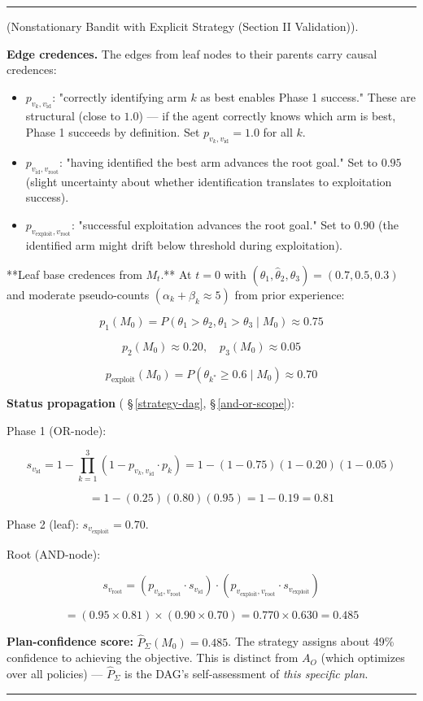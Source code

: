 \documentclass[11pt,oneside]{article}
\newcounter{claim}[section]
\renewcommand{\theclaim}{\thesection.\arabic{claim}}
\newenvironment{segment}[2]{%
  \refstepcounter{claim}%
  \bigskip\noindent\hrule\smallskip
  \noindent{\bfseries #1~\theclaim}\enskip(#2).\par\smallskip
  \noindent\ignorespaces
}{%
  \par\smallskip\noindent\hrule\bigskip
}
\newenvironment{remark}[1][]{\begin{segment}{Remark}{#1}}{\end{segment}}
\begin{document}
\begin{remark}[Nonstationary Bandit with Explicit Strategy (Section II Validation)]
\textbf{Edge credences.} The edges from leaf nodes to their parents carry causal credences:
\begin{itemize}
  \item $p_{v_k, v_\text{id}}$: "correctly identifying arm $k$ as best enables Phase 1 success." These are structural (close to $1.0$) — if the agent correctly knows which arm is best, Phase 1 succeeds by definition. Set $p_{v_k, v_\text{id}} = 1.0$ for all $k$.
  \item $p_{v_\text{id}, v_\text{root}}$: "having identified the best arm advances the root goal." Set to $0.95$ (slight uncertainty about whether identification translates to exploitation success).
  \item $p_{v_\text{exploit}, v_\text{root}}$: "successful exploitation advances the root goal." Set to $0.90$ (the identified arm might drift below threshold during exploitation).
\end{itemize}


**Leaf base credences from $M_t$.** At $t = 0$ with $(\hat\theta_1, \hat\theta_2, \hat\theta_3) = (0.7, 0.5, 0.3)$ and moderate pseudo-counts $(\alpha_k + \beta_k \approx 5)$ from prior experience:

$$p_1(M_0) = P(\theta_1 > \theta_2, \theta_1 > \theta_3 \mid M_0) \approx 0.75$$

$$p_2(M_0) \approx 0.20, \quad p_3(M_0) \approx 0.05$$

$$p_\text{exploit}(M_0) = P(\theta_{k^*} \geq 0.6 \mid M_0) \approx 0.70$$

\textbf{Status propagation} ( \S\,\ref{strategy-dag}, \S\,\ref{and-or-scope}):

Phase 1 (OR-node):

$$s_{v_\text{id}} = 1 - \prod_{k=1}^{3}(1 - p_{v_k, v_\text{id}} \cdot p_k) = 1 - (1 - 0.75)(1 - 0.20)(1 - 0.05)$$

$$= 1 - (0.25)(0.80)(0.95) = 1 - 0.19 = 0.81$$

Phase 2 (leaf): $s_{v_\text{exploit}} = 0.70$.

Root (AND-node):

$$s_{v_\text{root}} = (p_{v_\text{id}, v_\text{root}} \cdot s_{v_\text{id}}) \cdot (p_{v_\text{exploit}, v_\text{root}} \cdot s_{v_\text{exploit}})$$

$$= (0.95 \times 0.81) \times (0.90 \times 0.70) = 0.770 \times 0.630 = 0.485$$

\textbf{Plan-confidence score:} $\hat P_\Sigma(M_0) = 0.485$. The strategy assigns about 49\% confidence to achieving the objective. This is distinct from $A_O$ (which optimizes over all policies) — $\hat P_\Sigma$ is the DAG's self-assessment of \textit{this specific plan}.



\end{remark}
\end{document}
